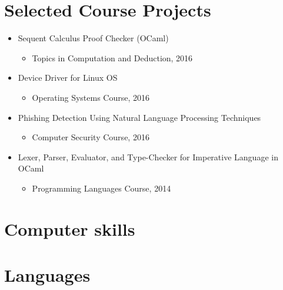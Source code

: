 \documentclass[11pt,a4paper,sans]{moderncv}        %
\begin{document}
\section{Selected Course Projects}
\begin{itemize}
\item Sequent Calculus Proof Checker (OCaml)
    \begin{itemize}
    \item Topics in Computation and Deduction, 2016
    \end{itemize}

\item Device Driver for Linux OS
    \begin{itemize}
    \item Operating Systems Course, 2016
    \end{itemize}

\item Phishing Detection Using Natural Language Processing Techniques
    \begin{itemize}
    \item Computer Security Course, 2016
    \end{itemize}
    
\item Lexer, Parser, Evaluator, and Type-Checker for Imperative Language in OCaml
    \begin{itemize}
    \item Programming Languages Course, 2014
    \end{itemize}



\end{itemize}

\section{Computer skills}

\section{Languages}
%
\end{document}
